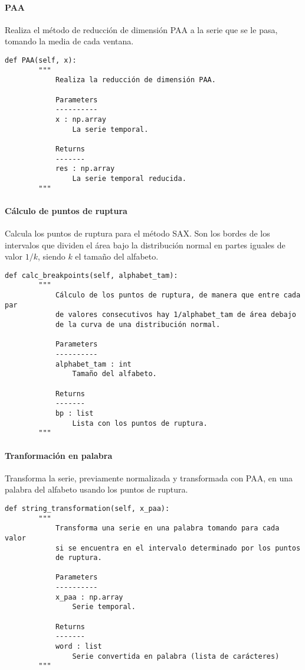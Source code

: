 \paragraph{PAA}

Realiza el método de reducción de dimensión PAA a la serie que se le pasa, tomando la media de cada ventana.

\begin{lstlisting}
def PAA(self, x):
        """
            Realiza la reducción de dimensión PAA.

            Parameters
            ----------
            x : np.array
                La serie temporal.

            Returns
            -------
            res : np.array
                La serie temporal reducida.
        """
\end{lstlisting}

\paragraph{Cálculo de puntos de ruptura}

Calcula los puntos de ruptura para el método SAX. Son los bordes de los intervalos que dividen el área bajo la distribución normal en partes iguales de valor $1 / k$, siendo $k$ el tamaño del alfabeto.

\begin{lstlisting}
def calc_breakpoints(self, alphabet_tam):
        """
            Cálculo de los puntos de ruptura, de manera que entre cada par
            de valores consecutivos hay 1/alphabet_tam de área debajo
            de la curva de una distribución normal.

            Parameters
            ----------
            alphabet_tam : int
                Tamaño del alfabeto.

            Returns
            -------
            bp : list
                Lista con los puntos de ruptura.
        """
\end{lstlisting}

\paragraph{Tranformación en palabra}

Transforma la serie, previamente normalizada y transformada con PAA, en una palabra del alfabeto usando los puntos de ruptura.

\begin{lstlisting}
def string_transformation(self, x_paa):
        """
            Transforma una serie en una palabra tomando para cada valor
            si se encuentra en el intervalo determinado por los puntos
            de ruptura.

            Parameters
            ----------
            x_paa : np.array
                Serie temporal.

            Returns
            -------
            word : list
                Serie convertida en palabra (lista de carácteres)
        """
\end{lstlisting}

